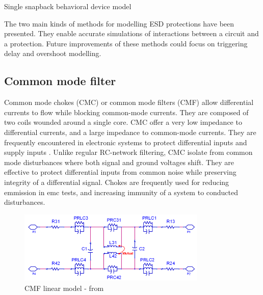 \begin{code}
\inputminted[frame=single,breaklines=true]{VHDL}{src/2/snippets/beh_snapback.vhd}
\caption{Single snapback behavioral device model}
\label{lst:snapback-device}
\end{code}


The two main kinds of methods for modelling ESD protections have been presented.
They enable accurate simulations of interactions between a circuit and a protection.
Future improvements of these methods could focus on triggering delay and overshoot modelling.

\subsection{Common mode filter}

Common mode chokes (CMC) or common mode filters (CMF) allow differential currents to flow while blocking common-mode currents.
They are composed of two coils wounded around a single core.
CMC offer a very low impedance to differential currents, and a large impedance to common-mode currents.
They are frequently encountered in electronic systems to protect differential inputs and supply inputs \cite{cmc-for-emc-protection, cmc-esd, alternative-cmc-emi-noise}.
Unlike regular RC-network filtering, CMC isolate from common mode disturbances where both signal and ground voltages shift.
They are effective to protect differential inputs from common noise while preserving integrity of a differential signal.
Chokes are frequently used for reducing emmission in \gls{emc} tests, and increasing immunity of a system to conducted disturbances.

\begin{figure}[!h]
  \centering
  \includegraphics[width=0.8\textwidth]{src/2/figures/cmc.png}
  \caption{CMF linear model - from \cite{usb2ESDProtection}}
  \label{fig:cmf-model}
\end{figure}

